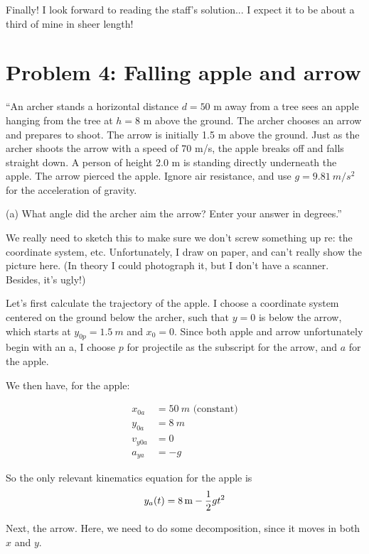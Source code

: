 \documentclass[8.01x]{subfiles}
\begin{document}
Finally! I look forward to reading the staff's solution... I expect it to be about a third of mine in sheer length!

\section{Problem 4: Falling apple and arrow}

``An archer stands a horizontal distance $d = 50$ m away from a tree sees an apple hanging from the tree at $h = 8$ m above the ground. The archer chooses an arrow and prepares to shoot. The arrow is initially 1.5 m above the ground. Just as the archer shoots the arrow with a speed of 70 m/s, the apple breaks off and falls straight down. A person of height 2.0 m is standing directly underneath the apple. The arrow pierced the apple. Ignore air resistance, and use $g = \SI{9.81}{m/s^2}$ for the acceleration of gravity.

(a) What angle did the archer aim the arrow? Enter your answer in degrees.''

We really need to sketch this to make sure we don't screw something up re: the coordinate system, etc. Unfortunately, I draw on paper, and can't really show the picture here. (In theory I could photograph it, but I don't have a scanner. Besides, it's ugly!)

Let's first calculate the trajectory of the apple. I choose a coordinate system centered on the ground below the archer, such that $y = 0$ is below the arrow, which starts at $y_{0p} = \SI{1.5}{m}$ and $x_0 = 0$. Since both apple and arrow unfortunately begin with an a, I choose $p$ for projectile as the subscript for the arrow, and $a$ for the apple.

We then have, for the apple:

\begin{align}
x_{0a} &= \SI{50}{m} \text{ (constant)}\\
y_{0a} &= \SI{8}{m}\\
v_{y0a} &= 0\\
a_{ya} &= -g
\end{align}

So the only relevant kinematics equation for the apple is
\begin{equation}
y_{a}(t) = \SI{8}{m} - \frac{1}{2} g t^2\\
\end{equation}

Next, the arrow. Here, we need to do some decomposition, since it moves in both $x$ and $y$.
\end{document}
